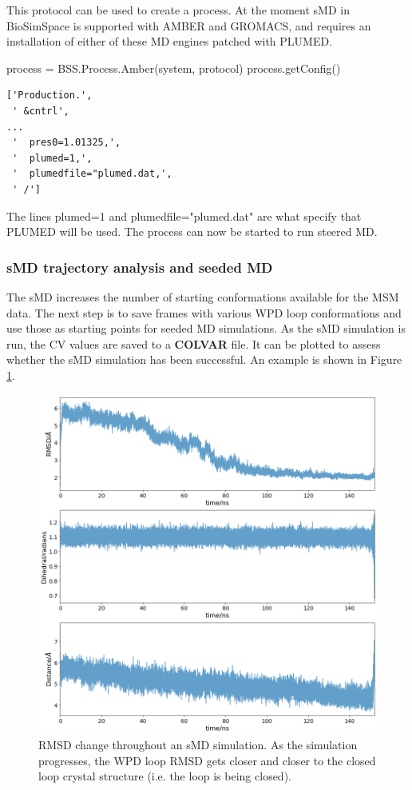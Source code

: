 This protocol can be used to create a process. At the moment sMD in BioSimSpace is supported with AMBER and GROMACS, and requires an installation of either of these MD engines patched with PLUMED.
\begin{python}
process = BSS.Process.Amber(system, protocol)
process.getConfig()
\end{python}
\begin{lstlisting}[columns=flexible]
['Production.',
 ' &cntrl',
...
 '  pres0=1.01325,',
 '  plumed=1,',
 '  plumedfile="plumed.dat,',
 ' /']
\end{lstlisting}

The lines plumed=1 and plumedfile="plumed.dat" are what specify that PLUMED will be used. The process can now be started to run steered MD.

\subsubsection{sMD trajectory analysis and seeded MD}
The sMD increases the number of starting conformations available for the MSM data. The next step is to save frames with various WPD loop conformations and use those as starting points for seeded MD simulations. As the sMD simulation is run, the CV values are saved to a \textbf{COLVAR} file. It can be plotted to assess whether the sMD simulation has been successful. An example is shown in Figure \ref{fig:rmsd}.

\begin{figure}[htp]
    \centering
    \includegraphics[width=\linewidth]{03_steered_md/figures/COLVAR_all.png}
    \caption{RMSD change throughout an sMD simulation. As the simulation progresses, the WPD loop RMSD gets closer and closer to the closed loop crystal structure (i.e. the loop is being closed).}
    \label{fig:rmsd}
\end{figure}

